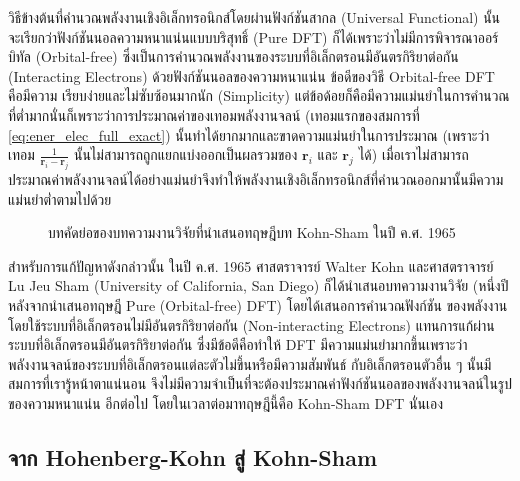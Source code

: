 วิธีข้างต้นที่คำนวณพลังงานเชิงอิเล็กทรอนิกส์โดยผ่านฟังก์ชันสากล (Universal Functional) นั้นจะเรียกว่าฟังก์ชันนอลความหนาแน่นแบบบริสุทธิ์ 
(Pure DFT) ก็ได้เพราะว่าไม่มีการพิจารณาออร์บิทัล (Orbital-free) ซึ่งเป็นการคำนวณพลังงานของระบบที่อิเล็กตรอนมีอันตรกิริยาต่อกัน 
(Interacting Electrons) ด้วยฟังก์ชันนอลของความหนาแน่น\autocite{ligneres2005} ข้อดีของวิธี Orbital-free DFT คือมีความ%
เรียบง่ายและไม่ซับซ้อนมากนัก (Simplicity) แต่ข้อด้อยก็คือมีความแม่นยำในการคำนวณที่ต่ำมากนั่นก็เพราะว่าการประมาณค่าของเทอมพลังงานจลน์ 
(เทอมแรกของสมการที่ \ref{eq:ener_elec_full_exact}) นั้นทำได้ยากมากและขาดความแม่นยำในการประมาณ (เพราะว่าเทอม 
$\frac{1}{\bm{r}_{i} - \bm{r}_{j}}$ นั้นไม่สามารถถูกแยกแบ่งออกเป็นผลรวมของ $\bm{r}_{i}$ และ $\bm{r}_{j}$ ได้) 
เมื่อเราไม่สามารถประมาณค่าพลังงานจลน์ได้อย่างแม่นยำจึงทำให้พลังงานเชิงอิเล็กทรอนิกส์ที่คำนวณออกมานั้นมีความแม่นยำต่ำตามไปด้วย 

\begin{figure}[H]
    \centering
    \caption{บทคัดย่อของบทความงานวิจัยที่นำเสนอทฤษฎีบท Kohn-Sham ในปี ค.ศ. 1965}
    \label{fig:kohn_sham_abs}
\end{figure}

สำหรับการแก้ปัญหาดังกล่าวนั้น ในปี ค.ศ. 1965 ศาสตราจารย์ Walter Kohn และศาสตราจารย์ Lu Jeu Sham (University of California, 
San Diego) ก็ได้นำเสนอบทความงานวิจัย (หนึ่งปีหลังจากนำเสนอทฤษฎี Pure (Orbital-free) DFT) โดยได้เสนอการคำนวณฟังก์ชัน%
ของพลังงานโดยใช้ระบบที่อิเล็กตรอนไม่มีอันตรกิริยาต่อกัน (Non-interacting Electrons) แทนการแก้ผ่านระบบที่อิเล็กตรอนมีอันตรกิริยาต่อกัน%
\autocite{kohn1965} ซึ่งมีข้อดีคือทำให้ DFT มีความแม่นยำมากขึ้นเพราะว่าพลังงานจลน์ของระบบที่อิเล็กตรอนแต่ละตัวไม่ขึ้นหรือมีความสัมพันธ์%
กับอิเล็กตรอนตัวอื่น ๆ นั้นมีสมการที่เรารู้หน้าตาแน่นอน จึงไม่มีความจำเป็นที่จะต้องประมาณค่าฟังก์ชันนอลของพลังงานจลน์ในรูปของความหนาแน่น%
อีกต่อไป โดยในเวลาต่อมาทฤษฎีนี้คือ Kohn-Sham DFT นั่นเอง

\subsection{จาก Hohenberg-Kohn สู่ Kohn-Sham}
\label{ssec:from_hk_to_ks}

